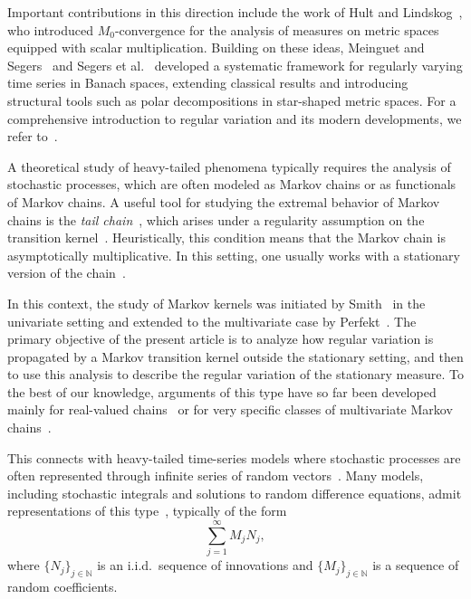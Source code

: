 \documentclass[preprint,12pt]{elsarticle}
\theoremstyle{definition}
\theoremstyle{remark}
\newcommand{\1}{{\mathbf 1}}
\numberwithin{equation}{section}
\begin{document}
  Important contributions in this direction include the work of Hult and Lindskog~\cite{hult2006regular}, 
  who introduced $M_0$-convergence for the analysis of measures on metric spaces equipped with scalar multiplication. 
  Building on these ideas, Meinguet and Segers~\cite{meinguet2010regularly} and Segers et al.~\cite{segers2017polar} 
  developed a systematic framework for regularly varying time series in Banach spaces, 
  extending classical results and introducing structural tools such as polar decompositions in 
  star-shaped metric spaces. For a comprehensive introduction to regular 
  variation and its modern developments, we refer to~\cite{kulik2020heavy,mikosch2024extreme}.

  A theoretical study of heavy-tailed phenomena typically requires the analysis of stochastic processes, 
  which are often modeled as Markov chains or as functionals of Markov chains. 
  A useful tool for studying the extremal behavior of Markov chains is the \emph{tail chain}~\cite{planinic2018tail}, 
  which arises under a regularity assumption on the transition kernel~\cite{resnick2013asymptotics}. 
  Heuristically, this condition means that the Markov chain is asymptotically multiplicative. 
  In this setting, one usually works with a stationary version of the chain~\cite{basrak2002regular}.

  In this context, the study of Markov kernels was initiated by Smith~\cite{Smith_1992} in the univariate 
  setting and extended to the multivariate case by Perfekt~\cite{perfekt_1994,Perfekt_1997}. 
  The primary objective of the present article is to analyze how regular variation is propagated by a Markov 
  transition kernel outside the stationary setting, and then to use this analysis to 
  describe the regular variation of the stationary measure. 
  To the best of our knowledge, arguments of this type have so far been developed mainly for 
  real-valued chains~\cite{grey1994regular,Palmowski_Zwart_2007,damek2018iterated,kesten1973random,goldie1991implicit} or 
  for very specific classes of multivariate Markov chains~\cite{AAP1579}.

  This connects with heavy-tailed time-series models where 
  stochastic processes are often represented through infinite series of 
  random vectors~\cite{embrechts2013modelling}. Many models, including stochastic integrals and solutions 
  to random difference equations, admit representations of this type~\cite{mikosch2000supremum}, typically of the form
  \begin{equation*}
    \sum_{j=1}^\infty M_j N_j,
  \end{equation*}
  where $\{N_j\}_{j \in \mathbb{N}}$ is an i.i.d.\ sequence of innovations and 
  $\{M_j\}_{j \in \mathbb{N}}$ is a sequence of random coefficients.
\end{document}
